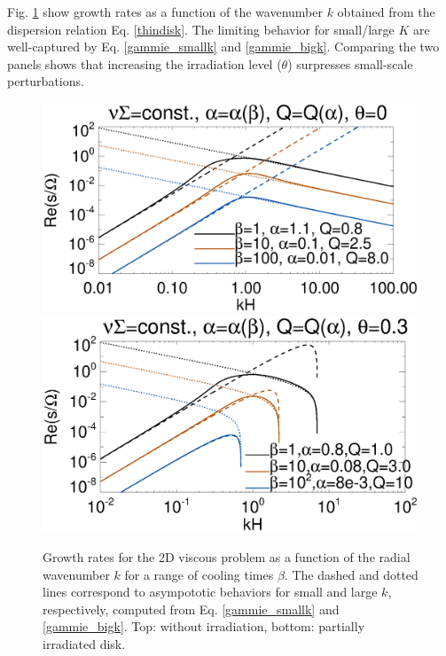 Fig. \ref{gammie_rate_plot} show growth rates as a function of the
wavenumber $k$ obtained from the dispersion relation
Eq. \ref{thindisk}. The limiting behavior for small/large $K$ are
well-captured by Eq. \ref{gammie_smallk} and
\ref{gammie_bigk}. Comparing the two panels shows that increasing the
irradiation level ($\theta$) surpresses small-scale
perturbations. %



\begin{figure}
  \includegraphics[width=\linewidth,clip=true,trim=0cm 2cm 0.cm
    0.0cm]{figures/viscsg_modes}\\
  \includegraphics[width=\linewidth,clip=true,trim=0cm 0cm 0.cm
    0.0cm]{figures/viscsg_modes_theta0d3}
  \caption{Growth rates for the 2D viscous problem as a function of
    the radial wavenumber $k$ for a range of cooling times
    $\beta$. The dashed and dotted lines correspond to asympototic
    behaviors for small and large $k$, respectively, computed from
    Eq. \ref{gammie_smallk} and \ref{gammie_bigk}. Top: without
    irradiation, bottom: partially irradiated disk. 
    \label{gammie_rate_plot}}
\end{figure}


